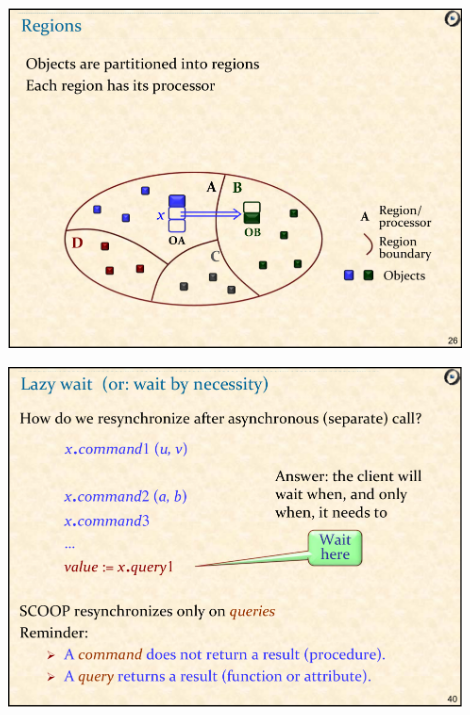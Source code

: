 \documentclass[xetex,mathserif,serif]{beamer}
\begin{document}
	\begin{frame}
		\begin{center}
			\includegraphics[width=0.9\textwidth]{meyer4.png}
		\end{center}
	\end{frame}

	\begin{frame}
		\begin{center}
			\includegraphics[width=0.9\textwidth]{meyer5.png}
		\end{center}
	\end{frame}
\end{document}
